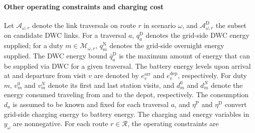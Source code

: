 \paragraph{Other operating constraints and charging cost}
Let $\mathcal A_{\omega,r}$ denote the link traversals on route $r$ in scenario $\omega$, and $\mathcal A^{\mathrm D}_{\omega,r}$ the subset on candidate DWC links.
For a traversal $a$, $q_a^{\mathrm D}$ denotes the grid-side DWC energy supplied; for a duty $m\in\mathcal M_{\omega,r}$, $q_m^{\mathrm N}$ denotes the grid-side overnight energy supplied.
The DWC energy bound $\bar q_a^{\mathrm D}$ is the maximum amount of energy that can be supplied via DWC for a given traversal.
The battery energy levels upon arrival at and departure from visit $v$ are denoted by $e_v^{\mathrm{arr}}$ and $e_v^{\mathrm{dep}}$, respectively.
For duty $m$, $v_m^0$ and $v_m^N$ denote its first and last station visits, and $d_m^0$ and $d_m^N$ denote the energy consumed traveling from and to the depot, respectively.
The consumption $d_a$ is assumed to be known and fixed for each traversal $a$, and $\eta^{\mathrm P}$ and $\eta^{\mathrm D}$ convert grid-side charging energy to battery energy.
The charging and energy variables in $y_\omega$ are nonnegative.
For each route $r\in\mathcal R$, the operating constraints are
\begingroup
\allowdisplaybreaks[2]
